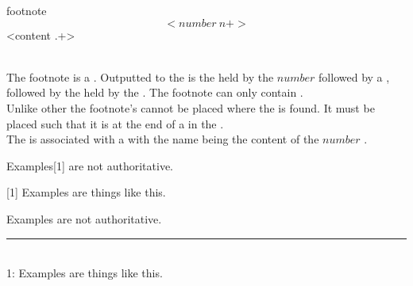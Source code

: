\begin{identifier}{footnote}
  \[<number ~n+>\] <content .+>
\end{identifier}
 \\

The footnote is a . Outputted to the  is the  held by the \inline$number$  followed by a , followed by the  held by the . The footnote can only contain . \\

Unlike other  the footnote's  cannot be placed where the  is found. It must be placed such that it is at the end of a  in the .\\

The  is associated with a  with the name being the content of the \inline$number$ . \\

\begin{examples}
  \begin{examplesource}
    Examples[1] are not authoritative.
    
    [1] Examples are things like this.
  \end{examplesource}
  \begin{exampleoutput}
    Examples\raisebox{.4ex}{\scriptsize \hyperref[footnote:ex1]{[1]}} are not authoritative. \\
    \rule{0.2\textwidth}{1pt} \\
    \label{footnote:ex1}1: Examples are things like this.
  \end{exampleoutput}
\end{examples}

